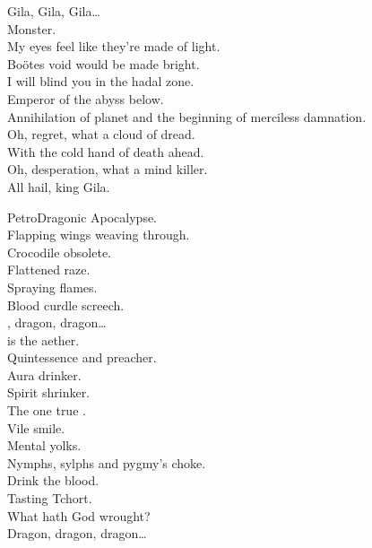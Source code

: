 Gila, Gila, Gila… \\
Monster. \\

My eyes feel like they're made of light. \\
Boötes void would be made bright. \\
I will blind you in the hadal zone. \\
Emperor of the abyss below. \\

Annihilation of planet  and the beginning of merciless damnation. \\

Oh, regret, what a cloud of dread. \\
With the cold hand of death ahead. \\
Oh, desperation, what a mind killer. \\
All hail, king Gila. \\



PetroDragonic Apocalypse. \\

Flapping wings weaving through. \\
Crocodile obsolete. \\
Flattened raze. \\
Spraying flames. \\
Blood curdle screech. \\

, dragon, dragon… \\

 is the aether. \\
Quintessence and preacher. \\
Aura drinker. \\
Spirit shrinker. \\
The one true . \\
Vile smile. \\
Mental yolks. \\
Nymphs, sylphs and pygmy's choke. \\
Drink the blood. \\
Tasting Tchort. \\
What hath God wrought? \\

Dragon, dragon, dragon… \\

